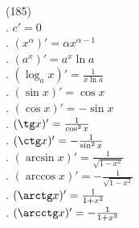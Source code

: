 (185)\\
. $c' = 0$\\
. $(x^{\alpha})' = \alpha x^{\alpha - 1}$\\
. $(a^x)' = a^x \ln a$\\
. $(\log_a x)' = \frac{1}{x\ln a}$\\
. $(\sin x)' = \cos x$\\
. $(\cos x)' = -\sin x$\\
. $(\tg x)' = \frac{1}{\cos^2 x}$\\
. $(\ctg x)' = -\frac{1}{\sin^2 x}$\\
. $(\arcsin x)' = \frac{1}{\sqrt{1 - x^2}}$\\
. $(\arccos x)' = -\frac{1}{\sqrt{1 - x^2}}$\\
. $(\arctg x)' = \frac{1}{1 + x^2}$\\
. $(\arcctg x)' = -\frac{1}{1 + x^2}$\\